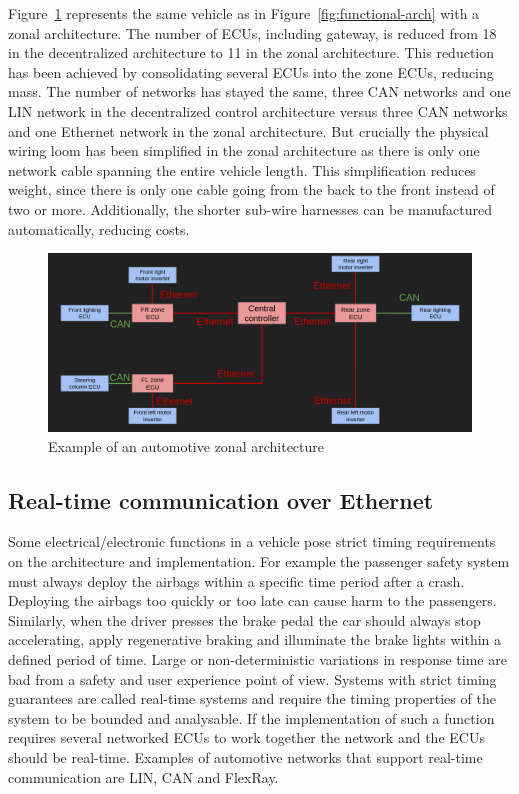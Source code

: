 Figure~\ref{fig:zonal-arch} represents the same vehicle as in Figure~\ref{fig:functional-arch} with a zonal architecture. The number of ECUs, including gateway, is reduced from 18 in the decentralized architecture to 11 in the zonal architecture. This reduction has been achieved by consolidating several ECUs into the zone ECUs, reducing mass. The number of networks has stayed the same, three CAN networks and one LIN network in the decentralized control architecture versus three CAN networks and one Ethernet network in the zonal architecture. But crucially the physical wiring loom has been simplified in the zonal architecture as there is only one network cable spanning the entire vehicle length. This simplification reduces weight, since there is only one cable going from the back to the front instead of two or more. Additionally, the shorter sub-wire harnesses can be manufactured automatically, reducing costs.

\begin{figure}[htb]
    \centering
    \includegraphics[width=\textwidth]{images/zone-arch.png}
    \caption{Example of an automotive zonal architecture}
    \label{fig:zonal-arch}
\end{figure}

\subsection{Real-time communication over Ethernet}
\label{sec:domain_ethernet}
Some electrical/electronic functions in a vehicle pose strict timing requirements on the architecture and implementation. For example the passenger safety system must always deploy the airbags within a specific time period after a crash. Deploying the airbags too quickly or too late can cause harm to the passengers. Similarly, when the driver presses the brake pedal the car should always stop accelerating, apply regenerative braking and illuminate the brake lights within a defined period of time. Large or non-deterministic variations in response time are bad from a safety and user experience point of view. Systems with strict timing guarantees are called real-time systems and require the timing properties of the system to be bounded and analysable. If the implementation of such a function requires several networked ECUs to work together the network and the ECUs should be real-time. Examples of automotive networks that support real-time communication are LIN, CAN and FlexRay. 

